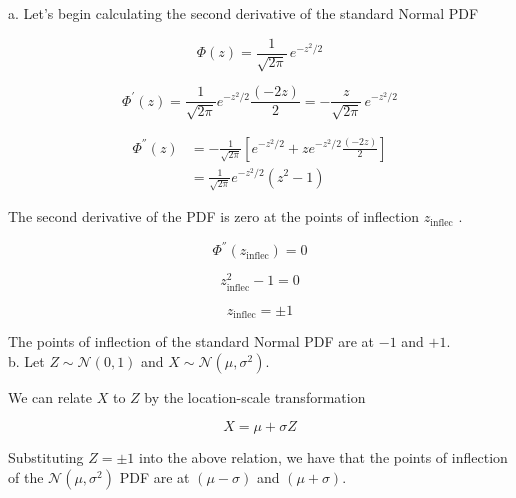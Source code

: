 a. Let's begin calculating the second derivative of the standard Normal PDF

$$
\Phi(z) = \frac{1}{\sqrt{2\pi}} \, e^{-z^2/2}
$$

$$
\Phi^{'}(z) = \frac{1}{\sqrt{2\pi}} e^{-z^2/2} \frac{(-2z)}{2} = -\frac{z}{\sqrt{2\pi}} \, e^{-z^2/2}
$$

\begin{equation*}
\begin{split}
\Phi^{''}(z)
&= -\frac{1}{\sqrt{2\pi}} \left[ e^{-z^2/2} + z e^{-z^2/2} \frac{(-2z)}{2} \right] \\
&= \frac{1}{\sqrt{2\pi}} e^{-z^2/2} (z^2 - 1)
\end{split}
\end{equation*}

The second derivative of the PDF is zero at the points of inflection $z_{\mathrm{inflec}}$ .

$$
\Phi^{''}(z_{\mathrm{inflec}}) = 0
$$

$$
z_{\mathrm{inflec}}^2-1 = 0
$$

$$
z_{\mathrm{inflec}} = \pm 1
$$

The points of inflection of the standard Normal PDF are at $-1$ and $+1$.\\

b. Let $Z \sim \mathcal{N}(0,1)$ and $X \sim \mathcal{N}(\mu,\sigma^2)$.

We can relate $X$ to $Z$ by the location-scale transformation

$$
X = \mu + \sigma Z
$$

Substituting $Z = \pm 1$ into the above relation, we have that the points of inflection of the $\mathcal{N}(\mu,\sigma^2)$ PDF are at $(\mu-\sigma)$ and $(\mu+\sigma)$.
